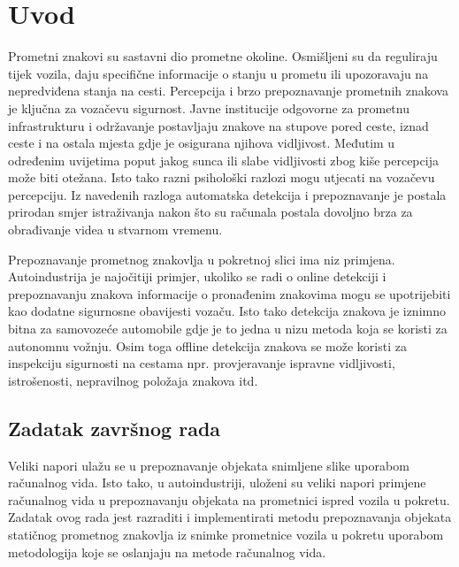 \newpage

\setcounter{page}{1}
\setcounter{figure}{0}
\section{Uvod}%
\label{sec:Uvod}

Prometni znakovi su sastavni dio prometne okoline. Osmišljeni su da
reguliraju tijek vozila, daju specifične informacije o stanju u prometu
ili upozoravaju na nepredviđena stanja na cesti. Percepcija i brzo
prepoznavanje prometnih znakova je ključna za vozačevu sigurnost. Javne
institucije odgovorne za prometnu infrastrukturu i održavanje
postavljaju znakove na stupove pored ceste, iznad ceste i na ostala
mjesta gdje je osigurana njihova vidljivost. Međutim u određenim
uvijetima poput jakog sunca ili slabe vidljivosti zbog kiše percepcija
može biti otežana. Isto tako razni psihološki razlozi mogu utjecati na
vozačevu percepciju. Iz navedenih razloga automatska detekcija i
prepoznavanje je postala prirodan smjer istraživanja nakon što su
računala postala dovoljno brza za obrađivanje videa u stvarnom vremenu.   

Prepoznavanje prometnog znakovlja u pokretnoj slici ima niz primjena.
Autoindustrija je najočitiji primjer, ukoliko se radi o online detekciji
i prepoznavanju znakova informacije o pronađenim znakovima mogu se
upotrijebiti kao dodatne sigurnosne obavijesti vozaču. Isto tako
detekcija znakova je iznimno bitna za samovozeće automobile gdje je to
jedna u nizu metoda koja se koristi za autonomnu vožnju. Osim toga
offline detekcija znakova se može koristi za inspekciju sigurnosti na
cestama npr. provjeravanje ispravne vidljivosti, istrošenosti,
nepravilnog položaja znakova itd. 




\newpage
\subsection{Zadatak završnog rada} %
\label{sub:Zadatak završnog rada}
Veliki napori ulažu se u prepoznavanje objekata snimljene slike uporabom
računalnog vida. Isto tako, u autoindustriji, uloženi su veliki napori
primjene računalnog vida u prepoznavanju objekata na prometnici ispred
vozila u pokretu. Zadatak ovog rada jest razraditi i implementirati
metodu prepoznavanja objekata statičnog prometnog znakovlja iz snimke
prometnice vozila u pokretu uporabom metodologija koje se oslanjaju na
metode računalnog vida.


